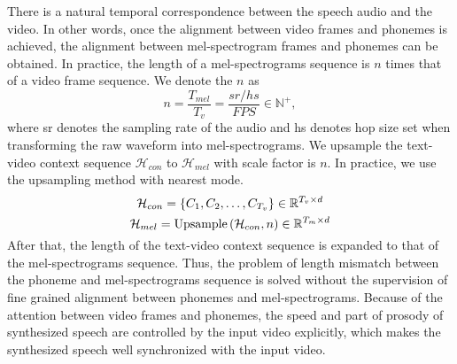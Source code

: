 \documentclass{article}
\begin{document}
There is a natural temporal correspondence between the speech audio and the video. In other words, once the alignment between video frames and phonemes is achieved, the alignment between mel-spectrogram frames and phonemes can be obtained.
In practice, the length of a mel-spectrograms sequence is $n$ times that of a video frame sequence. We denote the $n$ as 
\begin{equation}
\label{eq:rep_num}
n = \frac{T_{mel}}{T_v} = \frac{sr / hs} {FPS} \in \mathbb{N}^+ ,
\end{equation}
where sr denotes the sampling rate of the audio and hs denotes hop size set when transforming the raw waveform into mel-spectrograms. We upsample the text-video context sequence $\mathcal{H}_{con}$ to $\mathcal{H}_{m e l}$ with scale factor is $n$. In practice, we use the upsampling method with nearest mode.
\vspace{-0.1cm}
\begin{gather}
    \label{eq:repeat}
    \mathcal{H}_{con} = \left \{  C_{1}, C_{2}, \ldots, C_{T_v}\right \} \in \mathbb{R}^{T_v \times d} \\
\mathcal{H}_{m e l} = \operatorname{Upsample}\left(\mathcal{H}_{con}, n\right) \in \mathbb{R}^{T_m \times d}
\vspace{-0.1cm}
\end{gather}
After that, the length of the text-video context sequence is expanded to that of the mel-spectrograms sequence. Thus, the problem of length mismatch between the phoneme and mel-spectrograms sequence is solved without the supervision of fine grained alignment between phonemes and mel-spectrograms. Because of the attention between video frames and phonemes, the speed and part of prosody of synthesized speech are controlled by the input video explicitly, which makes the synthesized speech well synchronized with the input video.
\end{document}
